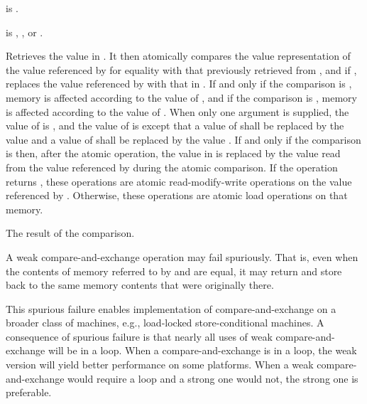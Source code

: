 \begin{itemdescr}
\pnum
\constraints
{} is .

\pnum
\expects
{} is
,
, or
.

\pnum
\effects
Retrieves the value in .
It then atomically compares the value representation of
the value referenced by  for equality
with that previously retrieved from ,
and if , replaces the value referenced by 
with that in .
If and only if the comparison is ,
memory is affected according to the value of , and
if the comparison is ,
memory is affected according to the value of .
When only one  argument is supplied,
the value of  is , and
the value of  is 
except that a value of  shall be replaced by
the value  and
a value of  shall be replaced by
the value .
If and only if the comparison is  then,
after the atomic operation,
the value in  is replaced by
the value read from the value referenced by 
during the atomic comparison.
If the operation returns ,
these operations are atomic read-modify-write operations
on the value referenced by .
Otherwise, these operations are atomic load operations on that memory.

\pnum
\returns
The result of the comparison.

\pnum
\remarks
A weak compare-and-exchange operation may fail spuriously.
That is, even when the contents of memory referred to
by  and  are equal,
it may return  and
store back to  the same memory contents
that were originally there.
\begin{note}
This spurious failure enables implementation of compare-and-exchange
on a broader class of machines, e.g., load-locked store-conditional machines.
A consequence of spurious failure is
that nearly all uses of weak compare-and-exchange will be in a loop.
When a compare-and-exchange is in a loop,
the weak version will yield better performance on some platforms.
When a weak compare-and-exchange would require a loop and
a strong one would not, the strong one is preferable.
\end{note}
\end{itemdescr}

